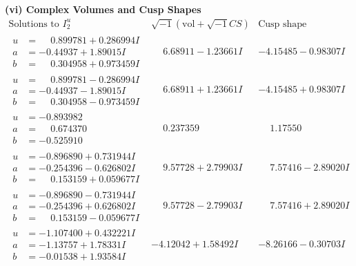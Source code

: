 \documentclass[1p]{elsarticle_modified}
\theoremstyle{definition}
\newcommand{\I}{\sqrt{-1}}
\begin{document}
\newpage\flushleft \textbf{(vi) Complex Volumes and Cusp Shapes}
$$\begin{array}{c|c|c}  
\text{Solutions to }I^u_{2}& \I (\text{vol} + \sqrt{-1}CS) & \text{Cusp shape}\\
 \hline 
\begin{aligned}
u &= \phantom{-}0.899781 + 0.286994 I \\
a &= -0.44937 + 1.89015 I \\
b &= \phantom{-}0.304958 + 0.973459 I\end{aligned}
 & \phantom{-}6.68911 - 1.23661 I & -4.15485 - 0.98307 I \\ \hline\begin{aligned}
u &= \phantom{-}0.899781 - 0.286994 I \\
a &= -0.44937 - 1.89015 I \\
b &= \phantom{-}0.304958 - 0.973459 I\end{aligned}
 & \phantom{-}6.68911 + 1.23661 I & -4.15485 + 0.98307 I \\ \hline\begin{aligned}
u &= -0.893982\phantom{ +0.000000I} \\
a &= \phantom{-}0.674370\phantom{ +0.000000I} \\
b &= -0.525910\phantom{ +0.000000I}\end{aligned}
 & \phantom{-}0.237359\phantom{ +0.000000I} & \phantom{-}1.17550\phantom{ +0.000000I} \\ \hline\begin{aligned}
u &= -0.896890 + 0.731944 I \\
a &= -0.254396 - 0.626802 I \\
b &= \phantom{-}0.153159 + 0.059677 I\end{aligned}
 & \phantom{-}9.57728 + 2.79903 I & \phantom{-}7.57416 - 2.89020 I \\ \hline\begin{aligned}
u &= -0.896890 - 0.731944 I \\
a &= -0.254396 + 0.626802 I \\
b &= \phantom{-}0.153159 - 0.059677 I\end{aligned}
 & \phantom{-}9.57728 - 2.79903 I & \phantom{-}7.57416 + 2.89020 I \\ \hline\begin{aligned}
u &= -1.107400 + 0.432221 I \\
a &= -1.13757 + 1.78331 I \\
b &= -0.01538 + 1.93584 I\end{aligned}
 & -4.12042 + 1.58492 I & -8.26166 - 0.30703 I \\ \hline\begin{aligned}

\end{aligned}
\end{array}$$
\end{document}
